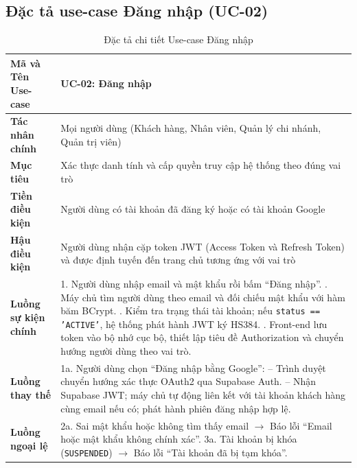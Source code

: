 \subsection{Đặc tả use-case Đăng nhập (UC-02)}
\begin{table}[H]
\centering
\small
\renewcommand{\arraystretch}{1.2}
\begin{tabular}{|p{3.6cm}|p{10.4cm}|}
\hline
\textbf{Mã và Tên Use-case} & \textbf{UC-02: Đăng nhập} \\ \hline
\textbf{Tác nhân chính} & Mọi người dùng (Khách hàng, Nhân viên, Quản lý chi nhánh, Quản trị viên) \\ \hline
\textbf{Mục tiêu} & Xác thực danh tính và cấp quyền truy cập hệ thống theo đúng vai trò \\ \hline
\textbf{Tiền điều kiện} & Người dùng có tài khoản đã đăng ký hoặc có tài khoản Google \\ \hline
\textbf{Hậu điều kiện} & Người dùng nhận cặp token JWT (Access Token và Refresh Token) và được định tuyến đến trang chủ tương ứng với vai trò \\ \hline
\textbf{Luồng sự kiện chính} & 
1. Người dùng nhập email và mật khẩu rồi bấm ``Đăng nhập''. \newline
2. Máy chủ tìm người dùng theo email và đối chiếu mật khẩu với hàm băm BCrypt. \newline
3. Kiểm tra trạng thái tài khoản; nếu \texttt{status == 'ACTIVE'}, hệ thống phát hành JWT ký HS384. \newline
4. Front-end lưu token vào bộ nhớ cục bộ, thiết lập tiêu đề Authorization và chuyển hướng người dùng theo vai trò. \\ \hline
\textbf{Luồng thay thế} & 
1a. Người dùng chọn ``Đăng nhập bằng Google'': \newline
-- Trình duyệt chuyển hướng xác thực OAuth2 qua Supabase Auth. \newline
-- Nhận Supabase JWT; máy chủ tự động liên kết với tài khoản khách hàng cùng email nếu có; phát hành phiên đăng nhập hợp lệ. \\ \hline
\textbf{Luồng ngoại lệ} & 
2a. Sai mật khẩu hoặc không tìm thấy email $\rightarrow$ Báo lỗi ``Email hoặc mật khẩu không chính xác''. \newline
3a. Tài khoản bị khóa (\texttt{SUSPENDED}) $\rightarrow$ Báo lỗi ``Tài khoản đã bị tạm khóa''. \\ \hline
\end{tabular}
\caption{Đặc tả chi tiết Use-case Đăng nhập}
\label{tab:uc_spec_02}
\end{table}

